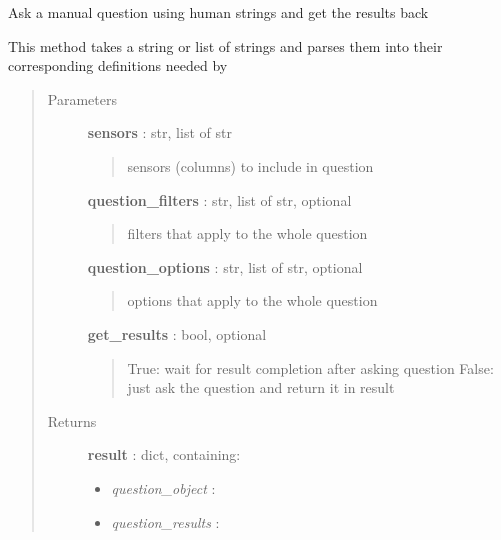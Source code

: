 \documentclass[letterpaper,10pt,english]{sphinxmanual}
\begin{document}

\begin{fulllineitems}
\label{pytan.handler:pytan.handler.Handler.ask_manual_human}
Ask a manual question using human strings and get the results back

This method takes a string or list of strings and parses them into
their corresponding definitions needed by {\hyperref[pytan.handler:pytan.handler.Handler.ask_manual]{}}
\begin{quote}\begin{description}
\item[{Parameters}] \leavevmode
\textbf{sensors} : str, list of str
\begin{quote}

sensors (columns) to include in question
\end{quote}

\textbf{question\_filters} : str, list of str, optional
\begin{quote}

filters that apply to the whole question
\end{quote}

\textbf{question\_options} : str, list of str, optional
\begin{quote}

options that apply to the whole question
\end{quote}

\textbf{get\_results} : bool, optional
\begin{quote}

True: wait for result completion after asking question
False: just ask the question and return it in result
\end{quote}

\item[{Returns}] \leavevmode
\textbf{result} : dict, containing:
\begin{itemize}
\item {} 
\emph{question\_object} : {\hyperref[taniumpy.object_types:taniumpy.object_types.question.Question]{}}

\item {} 
\emph{question\_results} : {\hyperref[taniumpy.object_types:taniumpy.object_types.result_set.ResultSet]{}}


\end{itemize}
\end{description}
\end{quote}
\end{fulllineitems}
\end{document}
